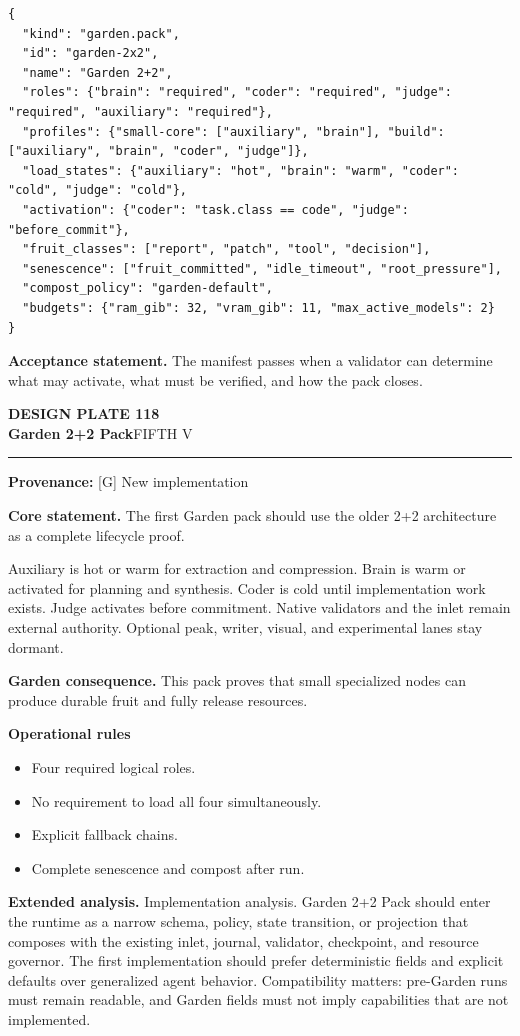 \documentclass[10pt,letterpaper,oneside]{article}
\newcommand{\prov}[1]{\textcolor{gardenBlue}{\sffamily\footnotesize\textbf{Provenance:} #1}}
\newcommand{\platetitle}[3]{%
  \begin{minipage}[t][0.54in][t]{\textwidth}
  {\sffamily\bfseries\color{gardenDeep}\fontsize{9}{10}\selectfont DESIGN PLATE #1}\\[-1pt]
  {\sffamily\bfseries\color{gardenInk}\fontsize{16.5}{18}\selectfont #2}\hfill{\sffamily\color{gardenGreen}\large #3}
  \end{minipage}\vspace{-2pt}\hrule\vspace{5pt}}
\begin{document}
\begin{lstlisting}
{
  "kind": "garden.pack",
  "id": "garden-2x2",
  "name": "Garden 2+2",
  "roles": {"brain": "required", "coder": "required", "judge": "required", "auxiliary": "required"},
  "profiles": {"small-core": ["auxiliary", "brain"], "build": ["auxiliary", "brain", "coder", "judge"]},
  "load_states": {"auxiliary": "hot", "brain": "warm", "coder": "cold", "judge": "cold"},
  "activation": {"coder": "task.class == code", "judge": "before_commit"},
  "fruit_classes": ["report", "patch", "tool", "decision"],
  "senescence": ["fruit_committed", "idle_timeout", "root_pressure"],
  "compost_policy": "garden-default",
  "budgets": {"ram_gib": 32, "vram_gib": 11, "max_active_models": 2}
}
\end{lstlisting}
\begin{acceptbox}
\textbf{Acceptance statement.} The manifest passes when a validator can determine what may activate, what must be verified, and how the pack closes.
\end{acceptbox}
\newpage
\platetitle{118}{Garden 2+2 Pack}{FIFTH V}
\prov{[G] New implementation}
\fontsize{8.85}{10.45}\selectfont
\begin{corebox}
\textbf{Core statement.} The first Garden pack should use the older 2+2 architecture as a complete lifecycle proof.
\end{corebox}
Auxiliary is hot or warm for extraction and compression. Brain is warm or activated for planning and synthesis. Coder is cold until implementation work exists. Judge activates before commitment. Native validators and the inlet remain external authority. Optional peak, writer, visual, and experimental lanes stay dormant.

\textbf{Garden consequence.} This pack proves that small specialized nodes can produce durable fruit and fully release resources.

\textbf{Operational rules}
\begin{itemize}
\item Four required logical roles.
\item No requirement to load all four simultaneously.
\item Explicit fallback chains.
\item Complete senescence and compost after run.
\end{itemize}
\textbf{Extended analysis.} Implementation analysis. Garden 2+2 Pack should enter the runtime as a narrow schema, policy, state transition, or projection that composes with the existing inlet, journal, validator, checkpoint, and resource governor. The first implementation should prefer deterministic fields and explicit defaults over generalized agent behavior. Compatibility matters: pre-Garden runs must remain readable, and Garden fields must not imply capabilities that are not implemented.
\end{document}
